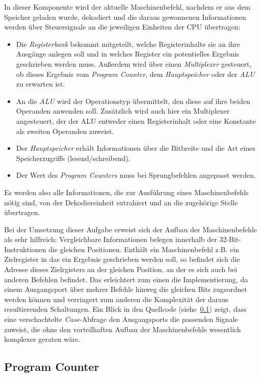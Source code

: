 In dieser Komponente wird der aktuelle Maschinenbefehl, nachdem er aus dem Speicher geladen wurde, dekodiert und die daraus gewonnenen Informationen werden über Steuersignale an die jeweiligen Einheiten der CPU übertragen:
\begin{itemize}
    \item Die \textit{Registerbank} bekommt mitgeteilt, welche Registerinhalte sie an ihre Ausgänge anlegen soll und in welches Register ein potentielles Ergebnis geschrieben werden muss.
        Außerdem wird über einen \textit{Multiplexer} gesteuert, ob dieses Ergebnis vom \textit{Program Counter}, dem \textit{Hauptspeicher} oder der \textit{ALU} zu erwarten ist.
    \item An die \textit{ALU} wird der Operationstyp übermittelt, den diese auf ihre beiden Operanden anwenden soll.
        Zusätzlich wird auch hier ein Multiplexer angesteuert, der der ALU entweder einen Registerinhalt oder eine Konstante als zweiten Operanden zuweist.
    \item Der \textit{Hauptspeicher} erhält Informationen über die Bitbreite und die Art eines Speicherzugriffs (lesend/schreibend).
    \item Der Wert des \textit{Program Counters} muss bei Sprungbefehlen angepasst werden.
\end{itemize}
Es werden also alle Informationen, die zur Ausführung eines Maschinenbefehls nötig sind, von der Dekodiereinheit extrahiert und an die zugehörige Stelle übertragen. 

Bei der Umsetzung dieser Aufgabe erweist sich der Aufbau der Maschinenbefehle als sehr hilfreich:
Vergleichbare Informationen belegen innerhalb der 32-Bit- Instruktionen die gleichen Positionen.
Enthält ein Maschinenbefehl z.B. ein Zielregister in das ein Ergebnis geschrieben werden soll, so befindet sich die Adresse dieses Zielrgisters an der gleichen Position, an der es sich auch bei anderen Befehlen befindet.
Das erleichtert zum einen die Implementierung, da einem Ausgangsport über mehrer Befehle hinweg die gleichen Bits zugeordnet werden können und verringert zum anderen die Komplexität der daraus resultierenden Schaltungen. 
Ein Blick in den Quellcode (siehe~\ref{}) zeigt, dass eine verschachtelte \textit{Case}-Abfrage den Ausgangsports die passenden Signale zuweist, die ohne den vorteilhaften Aufbau der Maschinenbefehle wesentlich komplexer geraten wäre.

\subsection{Program Counter}

